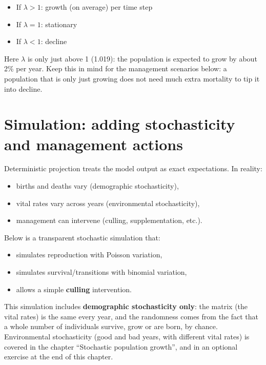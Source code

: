 \documentclass[
  a4paper]{book}
\providecommand{\tightlist}{%
  \setlength{\itemsep}{0pt}\setlength{\parskip}{0pt}}
\begin{document}
\begin{itemize}
\tightlist
\item
  If \(\lambda > 1\): growth (on average) per time step
\item
  If \(\lambda = 1\): stationary
\item
  If \(\lambda < 1\): decline
\end{itemize}

Here \(\lambda\) is only just above 1 (1.019): the population is expected to grow by about 2\% per year. Keep this in mind for the management scenarios below: a population that is only just growing does not need much extra mortality to tip it into decline.

\section{Simulation: adding stochasticity and management actions}\label{simulation-adding-stochasticity-and-management-actions}

Deterministic projection treats the model output as exact expectations. In reality:

\begin{itemize}
\tightlist
\item
  births and deaths vary (demographic stochasticity),
\item
  vital rates vary across years (environmental stochasticity),
\item
  management can intervene (culling, supplementation, etc.).
\end{itemize}

Below is a transparent stochastic simulation that:

\begin{itemize}
\tightlist
\item
  simulates reproduction with Poisson variation,
\item
  simulates survival/transitions with binomial variation,
\item
  allows a simple \textbf{culling} intervention.
\end{itemize}

This simulation includes \textbf{demographic stochasticity only}: the matrix (the vital rates) is the same every year, and the randomness comes from the fact that a whole number of individuals survive, grow or are born, by chance. Environmental stochasticity (good and bad years, with different vital rates) is covered in the chapter ``Stochastic population growth'', and in an optional exercise at the end of this chapter.
\end{document}
